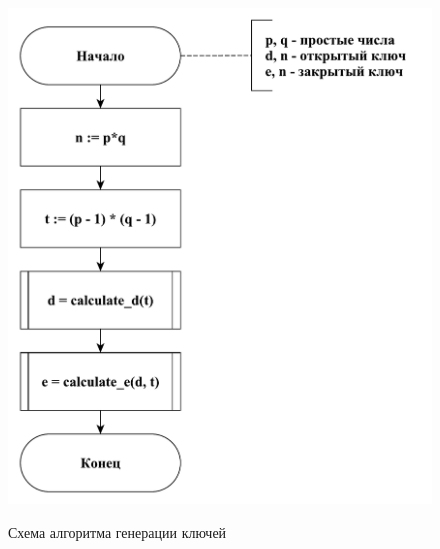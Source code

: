 \documentclass[a4paper,12pt]{article}
\begin{document}
\begin{figure}[h!]
    \begin{center}
    		{\includegraphics[scale = 0.5]{diagram/rsa1.pdf}}
       		\caption{Схема алгоритма генерации ключей }
       		\label{fig:s1}
	\end{center}
\end{figure}
\end{document}
